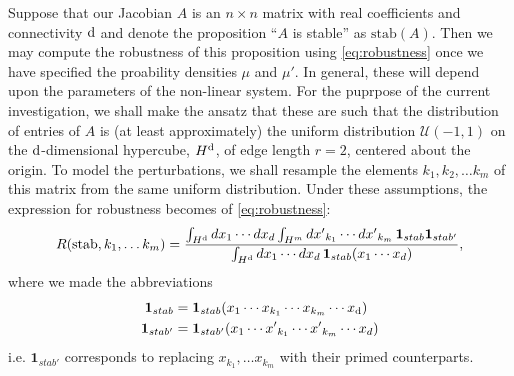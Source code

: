 
Suppose that our Jacobian $A$ is an $n \times n$ matrix with real
coefficients and connectivity $\mathrm{d}$ and denote the
proposition ``$A$ is stable'' as $\mathrm{stab}(A)$.  Then we may
compute the robustness of this proposition using \ref{eq:robustness}
once we have specified the proability densities $\mu$ and $\mu'$.  In
general, these will depend upon the parameters of the non-linear
system.  For the puprpose of the current investigation, we shall make
the ansatz that these are such that the distribution of entries of $A$
is (at least approximately) the uniform distribution
$\mathcal{U}(-1,1)$ on the $\mathrm{d}$-dimensional hypercube,
$H^{\mathrm{d}}$, of edge length $r=2$, centered about the origin.
To model the perturbations, we shall resample the elements $k_1,
k_2, \ldots k_m$ of this matrix from the same uniform distribution.
Under these assumptions, the expression for robustness becomes
of \ref{eq:robustness}:
\begin{equation}\label{eq:condprobgen}
 R (\mathrm{stab}, k_1, \ldots k_m) =
  \frac{\int_{H^{\mathrm{d}}} dx_1 \cdots dx_d \int_{H^m} {dx'}_{k_1} \cdots {dx'}_{k_m}\,
    \mathbf{1}_{stab} \mathbf{1}_{stab'}}
  {\int_{H^{\mathrm{d}}} dx_1 \cdots dx_d  \, \mathbf{1}_{stab}(x_1 \cdots x_d)},
\end{equation}
where we made the abbreviations
\begin{align*}
\mathbf{1}_{stab} &= \mathbf{1}_{stab}(x_1 \cdots x_{k_1} \cdots x_{k_m} \cdots x_{\mathrm{d}}) \\
\mathbf{1}_{stab'} &= \mathbf{1}_{stab'}(x_1 \cdots {x'}_{k_1} \cdots {x'}_{k_m}  \cdots x_d)
\end{align*}
i.e. $\mathbf{1}_{stab'}$ corresponds to replacing $x_{k_1}, \ldots x_{k_m}$ with their primed counterparts.

